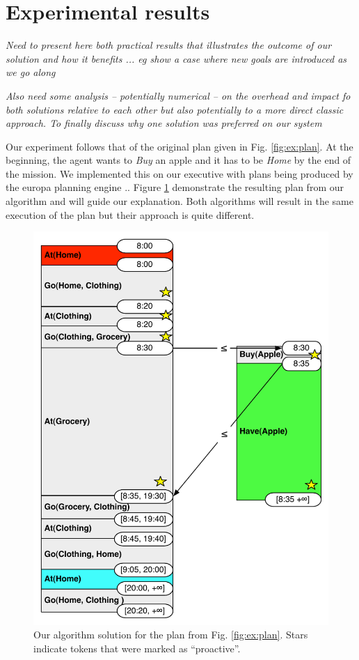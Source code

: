 
\section{Experimental results}
\label{sec:exp}

{\em\color{gray} Need to present here both practical results that illustrates the outcome of our solution and how it benefits ... eg show a case where new goals are introduced as we go along}

{\em\color{gray} Also need some analysis -- potentially numerical -- on the overhead and impact fo both solutions relative to each other but also potentially to a more direct classic approach. 
To finally discuss why one solution was preferred on our system} 

Our experiment follows that of the original plan given in
Fig. \ref{fig:ex:plan}. At the beginning, the agent wants to {\em Buy}
an apple and it has to be {\em Home} by the end of the mission. We
implemented this on our executive with plans being produced by the
europa planning engine \cite{frank2003}.. Figure \ref{fig:ex:mixed1}
demonstrate the resulting plan from our algorithm and will guide our
explanation. Both algorithms will result in the same execution of the
plan but their approach is quite different.

\begin{figure}
  \centering
  \includegraphics[width=0.8\columnwidth]{figs/example_MixedInitial}
  \caption{Our algorithm solution for the plan from
    Fig. \ref{fig:ex:plan}. Stars indicate tokens that were marked
  as ``proactive''.}
  \label{fig:ex:mixed1}
\end{figure}


